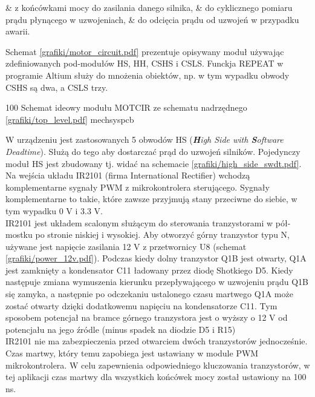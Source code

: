 \begin{easylist}
	& z końcówkami mocy do zasilania danego silnika,
	& do cyklicznego pomiaru prądu płynącego w uzwojeniach,
	& do odcięcia prądu od uzwojeń w przypadku awarii.
	\\
\end{easylist} 
	
Schemat \ref{grafiki/motor_circuit.pdf} prezentuje opisywany moduł używając zdefiniowanych pod-modułów HS, HH, CSHS i CSLS. Funckja REPEAT w programie Altium służy do mnożenia obiektów, np. w tym wypadku obwody CSHS są dwa, a CSLS trzy.

\clearpage

	{100}
	{Schemat ideowy modułu MOTCIR ze schematu nadrzędnego \ref{grafiki/top_level.pdf}}
	{mechsyspcb}


W urządzeniu jest zastosowanych 5 obwodów HS (\textit{\textbf{H}igh Side with \textbf{S}oftware Deadtime}). Służą do tego aby dostarczać prąd do uzwojeń silników. Pojedynczy moduł HS jest zbudowany tj. widać na schemacie \ref{grafiki/high_side_swdt.pdf}. Na wejścia układu IR2101 (firma International Rectifier) wchodzą komplementarne sygnały PWM z mikrokontrolera sterującego. Sygnały komplementarne to takie, które zawsze przyjmują stany przeciwne do siebie, w tym wypadku 0 V i 3.3 V. \\

IR2101 jest układem scalonym służącym do sterowania tranzystorami w pół-mostku po stronie niskiej i wysokiej. Aby otworzyć górny tranzystor typu N, używane jest napięcie zasilania 12 V z przetwornicy U8 (schemat \ref{grafiki/power_12v.pdf}). Podczas kiedy dolny tranzystor Q1B jest otwarty, Q1A jest zamknięty a kondensator C11 ładowany przez diodę Shotkiego D5. Kiedy następuje zmiana wymuszenia kierunku przepływającego w uzwojeniu prądu Q1B się zamyka, a następnie po odczekaniu ustalonego czasu martwego Q1A może zostać otwarty dzięki dodatkowemu napięciu na kondensatorze C11. Tym sposobem potencjał na bramce górnego tranzystora jest o wyższy o 12 V od potencjału na jego źródle (minus spadek na diodzie D5 i R15)\\
	
IR2101 nie ma zabezpieczenia przed otwarciem dwóch tranzystorów jednocześnie. Czas martwy, który temu zapobiega jest ustawiany w module PWM mikrokontrolera. W celu zapewnienia odpowiedniego kluczowania tranzystorów, w tej aplikacji czas martwy dla wszystkich końcówek mocy został ustawiony na 100 ns.

